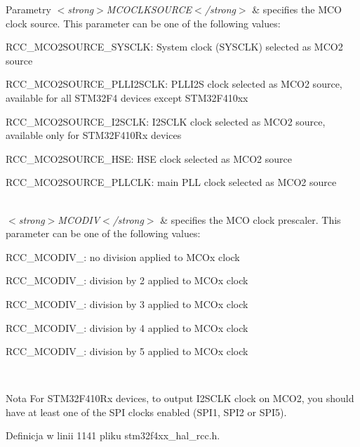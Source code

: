 \begin{DoxyParams}{Parametry}
{\em $<$strong$>$\+M\+C\+O\+C\+L\+K\+S\+O\+U\+R\+C\+E$<$/strong$>$} & specifies the M\+CO clock source. This parameter can be one of the following values\+: \begin{DoxyItemize}
\item R\+C\+C\+\_\+\+M\+C\+O2\+S\+O\+U\+R\+C\+E\+\_\+\+S\+Y\+S\+C\+LK\+: System clock (S\+Y\+S\+C\+LK) selected as M\+C\+O2 source \item R\+C\+C\+\_\+\+M\+C\+O2\+S\+O\+U\+R\+C\+E\+\_\+\+P\+L\+L\+I2\+S\+C\+LK\+: P\+L\+L\+I2S clock selected as M\+C\+O2 source, available for all S\+T\+M32\+F4 devices except S\+T\+M32\+F410xx \item R\+C\+C\+\_\+\+M\+C\+O2\+S\+O\+U\+R\+C\+E\+\_\+\+I2\+S\+C\+LK\+: I2\+S\+C\+LK clock selected as M\+C\+O2 source, available only for S\+T\+M32\+F410\+Rx devices \item R\+C\+C\+\_\+\+M\+C\+O2\+S\+O\+U\+R\+C\+E\+\_\+\+H\+SE\+: H\+SE clock selected as M\+C\+O2 source \item R\+C\+C\+\_\+\+M\+C\+O2\+S\+O\+U\+R\+C\+E\+\_\+\+P\+L\+L\+C\+LK\+: main P\+LL clock selected as M\+C\+O2 source \end{DoxyItemize}
\\
\hline
{\em $<$strong$>$\+M\+C\+O\+D\+I\+V$<$/strong$>$} & specifies the M\+CO clock prescaler. This parameter can be one of the following values\+: \begin{DoxyItemize}
\item R\+C\+C\+\_\+\+M\+C\+O\+D\+I\+V\+\_\+: no division applied to M\+C\+Ox clock \item R\+C\+C\+\_\+\+M\+C\+O\+D\+I\+V\+\_\+: division by 2 applied to M\+C\+Ox clock \item R\+C\+C\+\_\+\+M\+C\+O\+D\+I\+V\+\_\+: division by 3 applied to M\+C\+Ox clock \item R\+C\+C\+\_\+\+M\+C\+O\+D\+I\+V\+\_\+: division by 4 applied to M\+C\+Ox clock \item R\+C\+C\+\_\+\+M\+C\+O\+D\+I\+V\+\_\+: division by 5 applied to M\+C\+Ox clock \end{DoxyItemize}
\\
\hline
\end{DoxyParams}
\begin{DoxyNote}{Nota}
For S\+T\+M32\+F410\+Rx devices, to output I2\+S\+C\+LK clock on M\+C\+O2, you should have at least one of the S\+PI clocks enabled (S\+P\+I1, S\+P\+I2 or S\+P\+I5). 
\end{DoxyNote}


Definicja w linii 1141 pliku stm32f4xx\+\_\+hal\+\_\+rcc.\+h.

